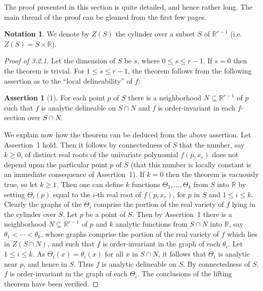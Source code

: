 \documentclass[11pt]{article}
\theoremstyle{plain}
\theoremstyle{definition}
\newtheorem*{notation}{Notation}
\newtheorem*{assertion}{Assertion}
\newcommand{\R}{\mathbb{R}}
\begin{document}
The proof presented in this section is quite detailed, and hence
rather long. The main thread of the proof can be gleaned from the
first few pages.

\begin{notation}
We denote by $Z(S)$ the cylinder over a subset $S$ of $\R^{r-1}$ (i.e.\
$Z(S) = S \times \R$).
\end{notation}

\begin{proof}[Proof of 3.2.1]
Let the dimension of $S$ be $s$, where $0 \le s \le r-1$. If $s = 0$
then the theorem is trivial. For $1 \le s \le r-1$, the theorem follows
from the following assertion as to the ``local delineability'' of $f$:

\begin{assertion}[1]
For each point $p$ of $S$ there is a neighborhood $N \subseteq \R^{r-1}$
of $p$ such that $f$ is analytic delineable on $S \cap N$ and $f$ is
order-invariant in each $f$-section over $S \cap N$.
\end{assertion}

We explain now how the theorem can be deduced from the above assertion.
Let Assertion~1 hold. Then it follows by connectedness of $S$ that the
number, say $k \ge 0$, of distinct real roots of the univariate
polynomial $f(p, x_r)$ does not depend upon the particular point $p$ of
$S$ (that this number is locally constant is an immediate consequence
of Assertion~1). If $k = 0$ then the theorem is vacuously true, so let
$k \ge 1$. Then one can define $k$ functions $\Theta_1, \ldots,
\Theta_k$ from $S$ into $\R$ by setting $\Theta_i(p)$ equal to the
$i$-th real root of $f(p, x_r)$, for $p$ in $S$ and $1 \le i \le k$.
Clearly the graphs of the $\Theta_i$ comprise the portion of the real
variety of $f$ lying in the cylinder over $S$. Let $p$ be a point of
$S$. Then by Assertion~1 there is a neighborhood $N \subseteq \R^{r-1}$
of $p$ and $k$ analytic functions from $S \cap N$ into $\R$, say
$\theta_1 < \cdots < \theta_k$, whose graphs comprise the portion of
the real variety of $f$ which lies in $Z(S \cap N)$, and such that $f$
is order-invariant in the graph of each $\theta_i$. Let
$1 \le i \le k$. As $\Theta_i(x) = \theta_i(x)$ for all $x$ in
$S \cap N$, it follows that $\Theta_i$ is analytic near $p$, and hence
in $S$. Thus $f$ is analytic delineable on $S$. By connectedness of
$S$, $f$ is order-invariant in the graph of each $\Theta_i$. The
conclusions of the lifting theorem have been verified.


\end{proof}
\end{document}
